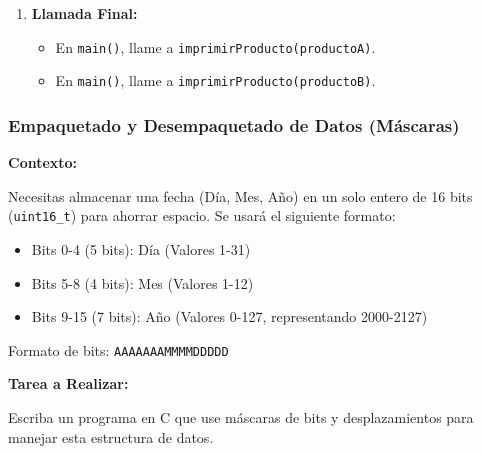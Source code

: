 \begin{enumerate}
    \item \textbf{Llamada Final:}
    \begin{itemize}
        \item En \texttt{main()}, llame a \texttt{imprimirProducto(productoA)}.
        \item En \texttt{main()}, llame a \texttt{imprimirProducto(productoB)}.
    \end{itemize}
\end{enumerate}

\subsubsection{Empaquetado y Desempaquetado de Datos (Máscaras)}

\textbf{Contexto:}

Necesitas almacenar una fecha (Día, Mes, Año) en un solo entero de 16 bits (\texttt{uint16\_t}) para ahorrar espacio. Se usará el siguiente formato:

\begin{itemize}
    \item Bits 0-4 (5 bits): Día (Valores 1-31)
    \item Bits 5-8 (4 bits): Mes (Valores 1-12)
    \item Bits 9-15 (7 bits): Año (Valores 0-127, representando 2000-2127)
\end{itemize}

Formato de bits: \texttt{AAAAAAAMMMMDDDDD}

\textbf{Tarea a Realizar:}

Escriba un programa en C que use máscaras de bits y desplazamientos para manejar esta estructura de datos.

